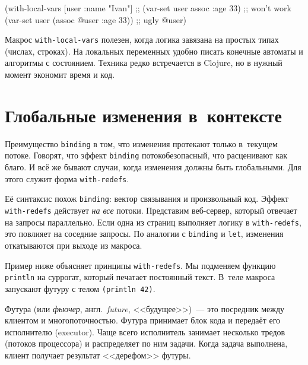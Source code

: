 \else

\begin{english}
  \begin{clojure}
(with-local-vars [user {:name "Ivan"}]
  ;; (var-set user assoc :age 33) ;; won't work
  (var-set user (assoc @user :age 33)) ;; ugly
  @user)
  \end{clojure}
\end{english}

\fi

Макрос \verb|with-local-vars| полезен, когда логика завязана на простых типах
(числах, строках). На локальных переменных удобно писать конечные автоматы и
алгоритмы с состоянием. Техника редко встречается в Clojure, но в нужный момент
экономит время и код.

\section{Глобальные изменения в~контексте}


\label{with-redefs}

Преимущество \verb|binding| в том, что изменения протекают только в~текущем
потоке. Говорят, что эффект \verb|binding| потокобезопасный, что расценивают
как благо. И всё же бывают случаи, когда изменения должны быть глобальными. Для
этого служит форма \verb|with-redefs|.

\mnoindent
Её синтаксис похож \verb|binding|: вектор связывания и произвольный
код. Эффект \verb|with-redefs| действует \emph{на все} потоки. Представим
веб-сервер, который отвечает на запросы параллельно. Если одна из страниц
выполняет логику в \verb|with-redefs|, это повлияет на соседние
запросы. По аналогии с \verb|binding| и \verb|let|, изменения откатываются при
выходе из макроса.

Пример ниже объясняет принципы \texttt{with\--redefs}. Мы подменяем функцию
\verb|println| на суррогат, который печатает постоянный текст. В~теле макроса
запускают футуру с телом \verb|(println 42)|.


Футура (или \emph{фьючер}, англ.~\emph{future}, <<будущее>>)~--- это посредник между
клиентом и многопоточностью. Футура принимает блок кода и передаёт его
исполнителю (executor). Чаще всего исполнитель занимает несколько тредов
(потоков процессора) и распределяет по ним задачи. Когда задача выполнена,
клиент получает результат <<дерефом>> футуры.

